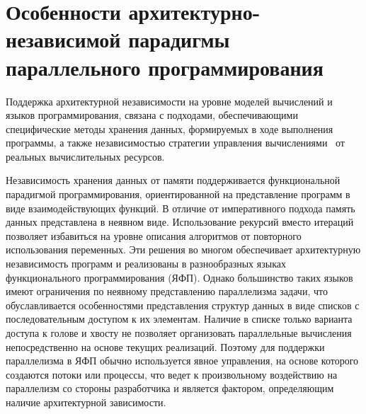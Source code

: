 
\chapter[Особенности АНППП]{Особенности архитектурно-независимой парадигмы параллельного программирования}

Поддержка архитектурной независимости на уровне моделей вычислений и языков программирования, связана с подходами, обеспечивающими специфические методы хранения данных, формируемых в ходе выполнения программы, а также независимостью стратегии управления вычислениями~\cite{strat} от реальных вычислительных ресурсов.

Независимость хранения данных от памяти поддерживается функциональной парадигмой программирования, ориентированной на представление программ в виде взаимодействующих функций. В отличие от императивного подхода память данных представлена в неявном виде. Использование рекурсий вместо итераций позволяет избавиться на уровне описания алгоритмов от повторного использования переменных. Эти решения во многом обеспечивает архитектурную независимость программ и реализованы в разнообразных языках функционального программирования (ЯФП). Однако большинство таких языков имеют ограничения по неявному представлению параллелизма задачи, что обуславливается особенностями представления структур данных в виде списков с последовательным доступом к их элементам. Наличие в списке только варианта доступа к голове и хвосту не позволяет организовать параллельные вычисления непосредственно на основе текущих реализаций. Поэтому для поддержки параллелизма в ЯФП обычно используется явное управления, на основе которого создаются потоки или процессы, что ведет к произвольному воздействию на параллелизм со стороны разработчика и является фактором, определяющим наличие архитектурной зависимости.

